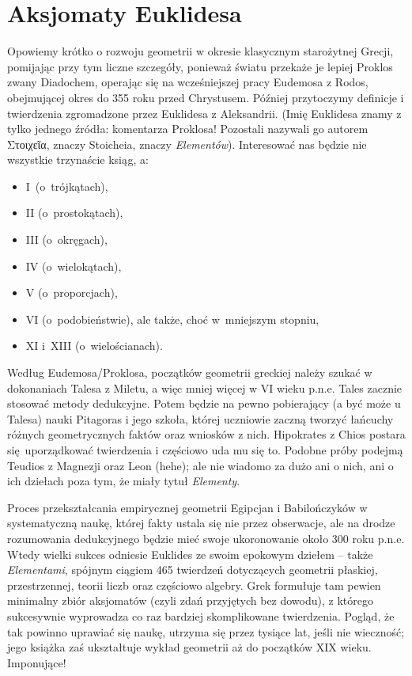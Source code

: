 %

\section{Aksjomaty Euklidesa}

Opowiemy krótko o rozwoju geometrii w okresie klasycznym starożytnej Grecji, pomijając przy tym liczne szczegóły, ponieważ światu przekaże je lepiej Proklos zwany Diadochem, operając się na wcześniejszej pracy  Eudemosa z Rodos, obejmującej okres do 355 roku przed Chrystusem.
%
%
Później przytoczymy definicje i twierdzenia zgromadzone przez Euklidesa z Aleksandrii.
(Imię Euklidesa znamy z tylko jednego źródła: komentarza Proklosa!
Pozostali nazywali go autorem Στοιχεῖα, znaczy Stoicheia, znaczy \emph{Elementów}).
Interesować nas będzie nie wszystkie trzynaście ksiąg, a:
\begin{itemize}
\item I~(o~trójkątach),
\item II (o~prostokątach),
\item III (o~okręgach),
\item IV (o~wielokątach),
\item V (o~proporcjach),
\item VI (o~podobieństwie), ale także, choć w~mniejszym stopniu,
\item XI i~XIII (o~wielościanach).
\end{itemize}

Według Eudemosa/Proklosa, początków geometrii greckiej należy szukać w dokonaniach Talesa z Miletu, a więc mniej więcej w VI wieku p.n.e.
Tales zacznie stosować metody dedukcyjne.
%
Potem będzie na pewno pobierający (a być może u Talesa) nauki Pitagoras i jego szkoła, której uczniowie zaczną tworzyć łańcuchy różnych geometrycznych faktów oraz wniosków z nich. 
%
Hipokrates z Chios postara się uporządkować twierdzenia i częściowo uda mu się to.
%
Podobne próby podejmą Teudios z Magnezji oraz Leon (hehe); ale nie wiadomo za dużo ani o nich, ani o ich dziełach poza tym, że miały tytuł \emph{Elementy}.
%
%

Proces przekształcania empirycznej geometrii Egipcjan i Babilończyków w systematyczną naukę, której fakty ustala się nie przez obserwacje, ale na drodze rozumowania dedukcyjnego będzie mieć swoje ukoronowanie około 300 roku p.n.e.
Wtedy wielki sukces odniesie Euklides ze swoim epokowym dziełem -- także \emph{Elementami}, spójnym ciągiem 465 twierdzeń dotyczących geometrii płaskiej, przestrzennej, teorii liczb oraz częściowo algebry.
Grek formułuje tam pewien minimalny zbiór aksjomatów (czyli zdań przyjętych bez dowodu), z którego sukcesywnie wyprowadza co raz bardziej skomplikowane twierdzenia.
Pogląd, że tak powinno uprawiać się naukę, utrzyma się przez tysiące lat, jeśli nie wieczność; jego książka zaś ukształtuje wykład geometrii aż do początków XIX wieku.
Imponujące!

